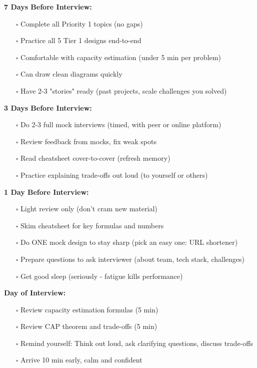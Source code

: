\documentclass[10pt]{article}
\begin{document}
\textbf{7 Days Before Interview:}
\begin{itemize}
\item[$\square$] Complete all Priority 1 topics (no gaps)
\item[$\square$] Practice all 5 Tier 1 designs end-to-end
\item[$\square$] Comfortable with capacity estimation (under 5 min per problem)
\item[$\square$] Can draw clean diagrams quickly
\item[$\square$] Have 2-3 "stories" ready (past projects, scale challenges you solved)
\end{itemize}

\textbf{3 Days Before Interview:}
\begin{itemize}
\item[$\square$] Do 2-3 full mock interviews (timed, with peer or online platform)
\item[$\square$] Review feedback from mocks, fix weak spots
\item[$\square$] Read cheatsheet cover-to-cover (refresh memory)
\item[$\square$] Practice explaining trade-offs out loud (to yourself or others)
\end{itemize}

\textbf{1 Day Before Interview:}
\begin{itemize}
\item[$\square$] Light review only (don't cram new material)
\item[$\square$] Skim cheatsheet for key formulas and numbers
\item[$\square$] Do ONE mock design to stay sharp (pick an easy one: URL shortener)
\item[$\square$] Prepare questions to ask interviewer (about team, tech stack, challenges)
\item[$\square$] Get good sleep (seriously - fatigue kills performance)
\end{itemize}

\textbf{Day of Interview:}
\begin{itemize}
\item[$\square$] Review capacity estimation formulas (5 min)
\item[$\square$] Review CAP theorem and trade-offs (5 min)
\item[$\square$] Remind yourself: Think out loud, ask clarifying questions, discuss trade-offs
\item[$\square$] Arrive 10 min early, calm and confident
\end{itemize}
\end{document}
